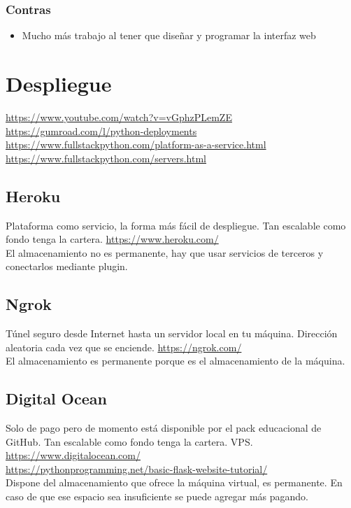 \subsubsection{Contras}
\begin{itemize}
	\item Mucho más trabajo al tener que diseñar y programar la interfaz web
\end{itemize}

\section{Despliegue}
\url{https://www.youtube.com/watch?v=vGphzPLemZE}\\
\url{https://gumroad.com/l/python-deployments}\\
\url{https://www.fullstackpython.com/platform-as-a-service.html}\\
\url{https://www.fullstackpython.com/servers.html}
\subsection{Heroku}
Plataforma como servicio, la forma más fácil de despliegue. Tan escalable como
fondo tenga la cartera. \url{https://www.heroku.com/}\\

El almacenamiento no es permanente, hay que usar servicios de terceros y
conectarlos mediante plugin.
\subsection{Ngrok}
Túnel seguro desde Internet hasta un servidor local en tu máquina. Dirección
aleatoria cada vez que se enciende. \url{https://ngrok.com/}\\

El almacenamiento es permanente porque es el almacenamiento de la máquina.
\subsection{Digital Ocean}
Solo de pago pero de momento está disponible por el pack educacional de GitHub.
Tan escalable como fondo tenga la cartera. VPS.\\
\url{https://www.digitalocean.com/}\\
\url{https://pythonprogramming.net/basic-flask-website-tutorial/}\\

Dispone del almacenamiento que ofrece la máquina virtual, es permanente. En caso
de que ese espacio sea insuficiente se puede agregar más pagando.
